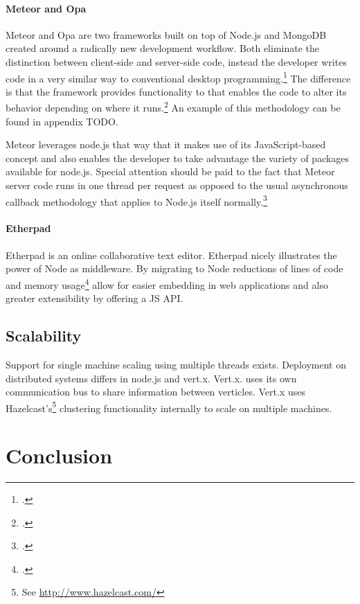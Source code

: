 \paragraph{Meteor and Opa}
Meteor and Opa are two frameworks built on top of Node.js and MongoDB created around a radically new development workflow. Both eliminate the distinction between client-side and server-side code, instead the developer writes code in a very similar way to conventional desktop programming.\footcite[Cf.][]{meteor_docs} The difference is that the framework provides functionality to that enables the code to alter its behavior depending on where it runs.\footcite[Cf.][]{meteor_docs} An example of this methodology can be found in appendix TODO.

Meteor leverages node.js that way that it makes use of its JavaScript-based concept and also enables the developer to take advantage the variety of packages available for node.js. Special attention should be paid to the fact that Meteor server code runs in one thread per request as opposed to the usual asynchronous callback methodology that applies to Node.js itself normally.\footcite[Cf.][]{meteor_docs}

\paragraph{Etherpad}
Etherpad is an online collaborative text editor. Etherpad nicely illustrates the power of Node as middleware. By migrating to Node reductions of lines of code and memory usage\footcite[Cf.][]{Weissschuh_2013} allow for easier embedding in web applications and also greater extensibility by offering a JS API.




\subsection{Scalability}
\label{scalability}
Support for single machine scaling using multiple threads exists.
Deployment on distributed systems differs in node.js and vert.x.
Vert.x. uses its own communication bus to share information between verticles.
Vert.x uses Hazelcast's\footnote{See \url{http://www.hazelcast.com/}} clustering functionality internally to scale on multiple machines. 


\section{Conclusion}
\label{conclusion}


